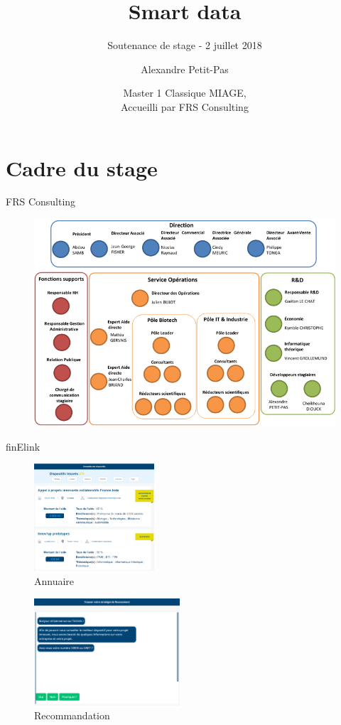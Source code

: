 \documentclass[10pt]{beamer}
\title{Smart data}
\subtitle{Soutenance de stage - 2 juillet 2018}
\date{Master 1 Classique MIAGE,\\
Accueilli par FRS Consulting
}
\author{Alexandre Petit-Pas}
\institute{Tuteur : Dr. Gaétan Le Chat\\ Référent : Prof. Pascal Poizat}
\begin{document}
	\maketitle
	\section{Cadre du stage}
		\begin{frame}{FRS Consulting}
			\begin{figure}\includegraphics[width=\linewidth]{resources/organigramme.png}\end{figure}
		\end{frame}
		\begin{frame}{finElink}
			\begin{minipage}[c]{0.49\linewidth}
				\begin{figure}\includegraphics[height=4cm, width=\linewidth]{resources/finelink2.png}\caption{Annuaire}\end{figure}
 			\end{minipage}
 			\begin{minipage}[c]{0.49\linewidth}
 					\begin{figure}\includegraphics[height=4cm, width=\linewidth]{resources/finelink1.png}\caption{Recommandation}\end{figure}
			\end{minipage}
		\end{frame}
\end{document}
